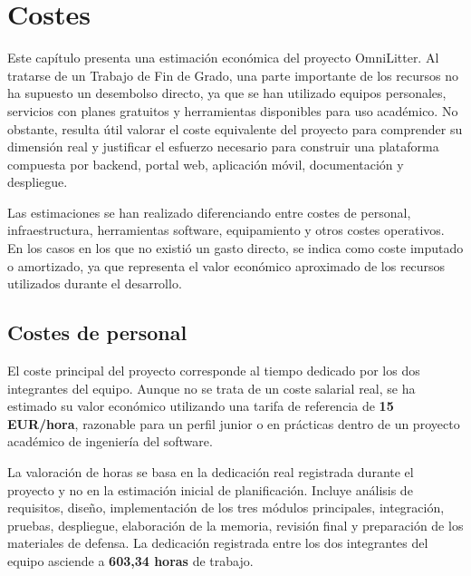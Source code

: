 
\chapter{Costes}
\label{sec:costes}

Este capítulo presenta una estimación económica del proyecto OmniLitter. Al
tratarse de un Trabajo de Fin de Grado, una parte importante de los recursos no ha
supuesto un desembolso directo, ya que se han utilizado equipos personales,
servicios con planes gratuitos y herramientas disponibles para uso académico. No
obstante, resulta útil valorar el coste equivalente del proyecto para comprender
su dimensión real y justificar el esfuerzo necesario para construir una plataforma
compuesta por backend, portal web, aplicación móvil, documentación y despliegue.

Las estimaciones se han realizado diferenciando entre costes de personal,
infraestructura, herramientas software, equipamiento y otros costes operativos. En
los casos en los que no existió un gasto directo, se indica como coste imputado o
amortizado, ya que representa el valor económico aproximado de los recursos
utilizados durante el desarrollo.

\section{Costes de personal}

El coste principal del proyecto corresponde al tiempo dedicado por los dos
integrantes del equipo. Aunque no se trata de un coste salarial real, se ha
estimado su valor económico utilizando una tarifa de referencia de
\textbf{15 EUR/hora}, razonable para un perfil junior o en prácticas dentro de un
proyecto académico de ingeniería del software.

La valoración de horas se basa en la dedicación real registrada durante el
proyecto y no en la estimación inicial de planificación. Incluye análisis de
requisitos, diseño, implementación de los tres módulos principales, integración,
pruebas, despliegue, elaboración de la memoria, revisión final y preparación de
los materiales de defensa. La dedicación registrada entre los dos integrantes del
equipo asciende a \textbf{603,34 horas} de trabajo.

